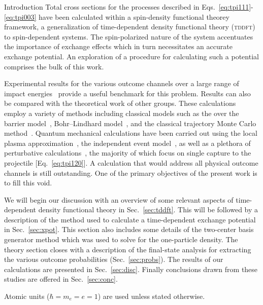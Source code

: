 \documentclass[aps, pra, reprint, groupedaddress, amsfonts, longbibliography,
               amsmath, amssymb, showpacs, nofootinbib]{revtex4-1}
\begin{document}
\begin{section}{Introduction \label{sec:intro}}
   Total cross sections for the processes described in Eqs.~\eqref{eq:tpi111}-\eqref{eq:tpi003} have
   been calculated within a spin-density functional theorey~\cite{td-spindep} framework, a
   generalization of time-dependent density functional theory (\textsc{tddft})~\cite{tddft, ullrich} to
   spin-dependent systems. The spin-polarized nature of the system accentuates the importance of
   exchange effects which in turn necessitates an accurate exchange potential. An exploration of a
   procedure for calculating such a potential comprises the bulk of this work.

   Experimental results for the various outcome channels over a large range of impact
   energies~\cite{BS58, HN78, HSE78, dCFdP88, DT-88, Dub-89, ASL91, FTFHLP-95, SSMSM-11} provide a
   useful benchmark for this problem. Results can also be compared with the theoretical work of other
   groups. These calculations employ a variety of methods including classical models such as the over
   the barrier model~\cite{CC-07}, Bohr–Lindhard model~\cite{DYC-08, DLZ-12}, and the classical
   trajectory Monte Carlo method~\cite{GMZ17}. Quantum mechanical calculations have been carried out
   using the local plasma approximation~\cite{MMA03}, the independent event model~\cite{SM-03}, as well
   as a plethora of perturbative calculations~\cite{Mancev96, BOC05, Mancev-07, MG-10, NTC11, GG-12b,
   GAG15}, the majority of which focus on single capture to the projectile [Eq.~\eqref{eq:tpi120}]. A
   calculation that would address all physical outcome channels is still outstanding. One of the primary
   objectives of the present work is to fill this void.

   We will begin our discussion with an overview of some relevant aspects of time-dependent density
   functional theory in Sec.~\ref{sec:tddft}. This will be followed by a description of the method used
   to calculate a time-dependent exchange potential in Sec.~\ref{sec:xpot}. This section also includes
   some details of the two-center basis generator method which was used to solve for the one-particle
   density. The theory section closes with a description of the final-state analysis for extracting
   the various outcome probabilities (Sec.~\ref{sec:probs}). The results of our calculations are
   presented in Sec.~\ref{sec:disc}. Finally conclusions drawn from these studies are offered in
   Sec.~\ref{sec:conc}.

   Atomic units ($\hbar = m_e = e = 1$) are used unless stated otherwise.

\end{section}
\end{document}
